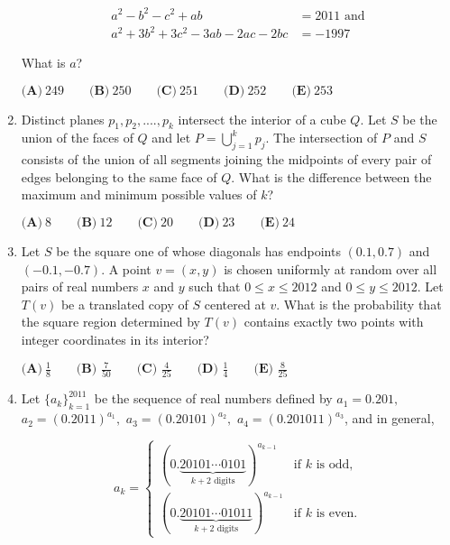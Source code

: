 \documentclass{article}
\begin{document}
\begin{enumerate}[label=\arabic*., itemsep=0.5em]
\begin{align*}a^{2}-b^{2}-c^{2}+ab&=2011\text{ and}\\
a^{2}+3b^{2}+3c^{2}-3ab-2ac-2bc&=-1997
\end{align*}

What is \(a\)?

\( \textbf{(A)}\ 249\qquad\textbf{(B)}\ 250\qquad\textbf{(C)}\ 251\qquad\textbf{(D)}\ 252\qquad\textbf{(E)}\ 253 \)\par \vspace{0.5em}\item Distinct planes \(p_1,p_2,....,p_k\) intersect the interior of a cube \(Q\). Let \(S\) be the union of the faces of \(Q\) and let \( P =\bigcup_{j=1}^{k}p_{j} \). The intersection of \(P\) and \(S\) consists of the union of all segments joining the midpoints of every pair of edges belonging to the same face of \(Q\). What is the difference between the maximum and minimum possible values of \(k\)?

\( \textbf{(A)}\ 8\qquad\textbf{(B)}\ 12\qquad\textbf{(C)}\ 20\qquad\textbf{(D)}\ 23\qquad\textbf{(E)}\ 24 \)\par \vspace{0.5em}\item Let \(S\) be the square one of whose diagonals has endpoints \((0.1,0.7)\) and \((-0.1,-0.7)\).  A point \(v=(x,y)\) is chosen uniformly at random over all pairs of real numbers \(x\) and \(y\) such that \(0 \le x \le 2012\) and \(0\le y\le 2012\).  Let \(T(v)\) be a translated copy of \(S\) centered at \(v\).  What is the probability that the square region determined by \(T(v)\) contains exactly two points with integer coordinates in its interior?

\( \textbf{(A)}\ \frac{1}{8}\qquad\textbf{(B) }\frac{7}{50}\qquad\textbf{(C) }\frac{4}{25}\qquad\textbf{(D) }\frac{1}{4}\qquad\textbf{(E) }\frac{8}{25} \)\par \vspace{0.5em}\item Let \(\{a_k\}_{k=1}^{2011}\) be the sequence of real numbers defined by \(a_1=0.201,\) \(a_2=(0.2011)^{a_1},\) \(a_3=(0.20101)^{a_2},\) \(a_4=(0.201011)^{a_3}\), and in general, 


\begin{equation*}
a_k=\begin{cases}
(0.\underbrace{20101\cdots 0101}_{k+2\text{ digits}})^{a_{k-1}} & \text{if }k\text{ is odd,}\\
(0.\underbrace{20101\cdots 01011}_{k+2\text{ digits}})^{a_{k-1}}& \text{if }k\text{ is even.}
\end{cases}
\end{equation*}



\end{enumerate}
\end{document}
